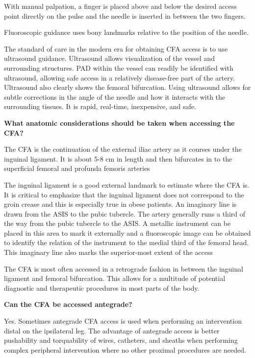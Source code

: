\documentclass[
]{book}
\begin{document}
With manual palpation, a finger is placed above and below the desired
access point directly on the pulse and the needle is inserted in between
the two fingers.

Fluoroscopic guidance uses bony landmarks relative to the position of
the needle.

The standard of care in the modern era for obtaining CFA access is to
use ultrasound guidance. Ultrasound allows visualization of the vessel
and surrounding structures. PAD within the vessel can readily be
identified with ultrasound, allowing safe access in a relatively
disease-free part of the artery. Ultrasound also clearly shows the
femoral bifurcation. Using ultrasound allows for subtle corrections in
the angle of the needle and how it interacts with the surrounding
tissues. It is rapid, real-time, inexpensive, and safe.

\textbf{What anatomic considerations should be taken when accessing the CFA?}

The CFA is the continuation of the external iliac artery as it courses
under the inguinal ligament. It is about 5-8 cm in length and then
bifurcates in to the superficial femoral and profunda femoris arteries

The inguinal ligament is a good external landmark to estimate where the
CFA is. It is critical to emphasize that the inguinal ligament does not
correspond to the groin crease and this is especially true in obese
patients. An imaginary line is drawn from the ASIS to the pubic
tubercle. The artery generally runs a third of the way from the pubic
tubercle to the ASIS. A metallic instrument can be placed in this area
to mark it externally and a fluoroscopic image can be obtained to
identify the relation of the instrument to the medial third of the
femoral head. This imaginary line also marks the superior-most extent of
the access

The CFA is most often accessed in a retrograde fashion in between the
inguinal ligament and femoral bifurcation. This allows for a multitude
of potential diagnostic and therapeutic procedures in most parts of the
body.

\textbf{Can the CFA be accessed antegrade?}

Yes. Sometimes antegrade CFA access is used when performing an
intervention distal on the ipsilateral leg. The advantage of antegrade
access is better pushability and torquability of wires, catheters, and
sheaths when performing complex peripheral intervention where no other
proximal procedures are needed.
\end{document}
